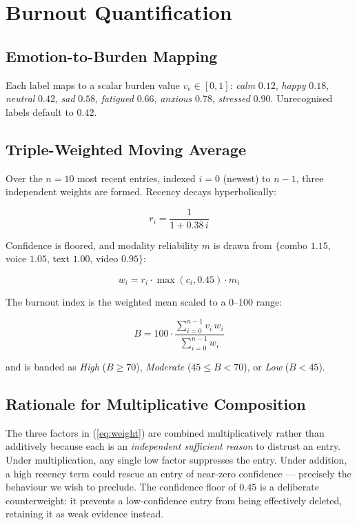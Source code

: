 \documentclass[conference]{IEEEtran}
\begin{document}
\section{Burnout Quantification}
\label{sec:burnout}

\subsection{Emotion-to-Burden Mapping}
Each label maps to a scalar burden value $v_e \in [0,1]$:
\textit{calm} $0.12$, \textit{happy} $0.18$, \textit{neutral} $0.42$,
\textit{sad} $0.58$, \textit{fatigued} $0.66$, \textit{anxious} $0.78$,
\textit{stressed} $0.90$. Unrecognised labels default to $0.42$.

\subsection{Triple-Weighted Moving Average}
Over the $n = 10$ most recent entries, indexed $i = 0$ (newest) to $n-1$,
three independent weights are formed. Recency decays hyperbolically:

\begin{equation}
r_i = \frac{1}{1 + 0.38\,i}
\end{equation}

Confidence is floored, and modality reliability $m$ is drawn from
$\{$combo $1.15$, voice $1.05$, text $1.00$, video $0.95\}$:

\begin{equation}
w_i = r_i \cdot \max(c_i, 0.45) \cdot m_i
\label{eq:weight}
\end{equation}

The burnout index is the weighted mean scaled to a 0--100 range:

\begin{equation}
B = 100 \cdot \frac{\sum_{i=0}^{n-1} v_i\, w_i}{\sum_{i=0}^{n-1} w_i}
\end{equation}

and is banded as \textit{High} ($B \geq 70$), \textit{Moderate}
($45 \leq B < 70$), or \textit{Low} ($B < 45$).

\subsection{Rationale for Multiplicative Composition}
The three factors in (\ref{eq:weight}) are combined multiplicatively rather
than additively because each is an \emph{independent sufficient reason} to
distrust an entry. Under multiplication, any single low factor suppresses the
entry. Under addition, a high recency term could rescue an entry of
near-zero confidence --- precisely the behaviour we wish to preclude. The
confidence floor of $0.45$ is a deliberate counterweight: it prevents a
low-confidence entry from being effectively deleted, retaining it as weak
evidence instead.
\end{document}
